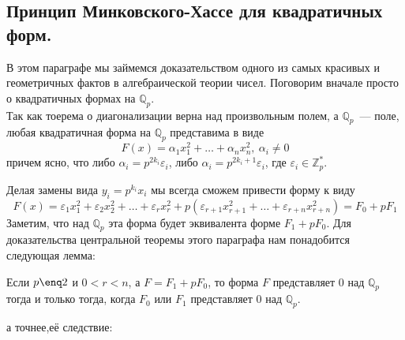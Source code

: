 \documentclass[11pt]{report}
\begin{document}
    \subsection{Принцип Минковского-Хассе для квадратичных форм.}

    В этом параграфе мы займемся доказательством одного из самых красивых и геометричных фактов в алгебраической теории чисел.
    Поговорим вначале просто о квадратичных формах на $\mathbb{Q}_p$.\\
    Так как тоерема о диагонализации верна над произвольным полем, а $\mathbb{Q}_p$~--- поле, любая квадратичная форма на $\mathbb{Q}_p$ представима в виде
    \[ F(x) = \alpha_1 x_1^2 + \ldots + \alpha_n x_n^2, \ \alpha_i \neq 0 \]
    причем ясно, что либо $\alpha_i = p^{2k_i} \varepsilon_i$, либо $\alpha_i = p^{2k_i + 1} \varepsilon_i$, где $\varepsilon_i \in \mathbb{Z}_p^{*}$.

    Делая замены вида $y_i = p^{k_i} x_i$ мы всегда сможем привести форму к виду
    \[ F(x) = \varepsilon_1 x_1^2 + \varepsilon_2 x_2^2 + \ldots + \varepsilon_r x_r^2  + p(\varepsilon_{r + 1} x_{r+ 1}^2 + \ldots + \varepsilon_{r + n} x_{r + n}^2) = F_0 + pF_1 \]
    Заметим, что над $\mathbb{Q}_p$ эта форма будет эквивалента форме $F_1 + pF_0$. Для доказательства центральной теоремы этого параграфа нам понадобится следующая лемма:

    \begin{lemma}
        Если $p \enq 2$ и $0 < r < n$, а $F = F_1 + pF_0$, то форма $F$ представляет 0 над $\mathbb{Q}_p$ тогда и только тогда, когда
        $F_0$ или $F_1$ представляет $0$ над $\mathbb{Q}_p$.
    \end{lemma}
    а точнее,её следствие:
\end{document}
